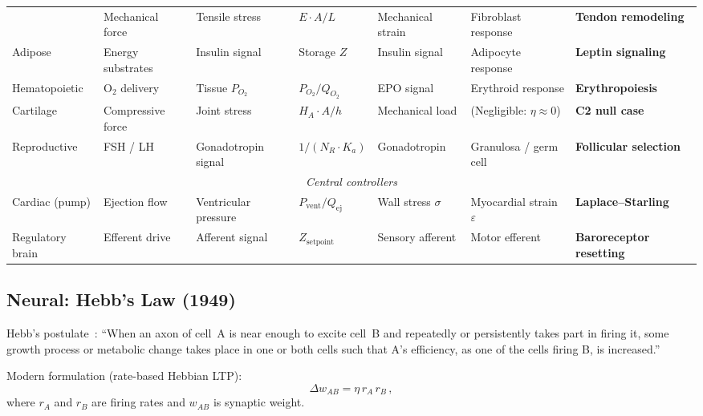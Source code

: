 \documentclass[aps,pre,twocolumn,superscriptaddress,floatfix]{revtex4-2}
\begin{document}
\begin{table}[t]
\begin{tabular}{lllllll}
  & Mechanical force & Tensile stress & $E \cdot A/L$
  & Mechanical strain & Fibroblast response & \textbf{Tendon remodeling} \\
Adipose
  & Energy substrates & Insulin signal & Storage $Z$
  & Insulin signal & Adipocyte response & \textbf{Leptin signaling} \\
Hematopoietic
  & O$_2$ delivery & Tissue $P_{O_2}$ & $P_{O_2}/Q_{O_2}$
  & EPO signal & Erythroid response & \textbf{Erythropoiesis} \\
Cartilage
  & Compressive force & Joint stress & $H_A \cdot A/h$
  & Mechanical load & (Negligible: $\eta \approx 0$) & \textbf{C2 null case} \\
Reproductive
  & FSH / LH & Gonadotropin signal & $1/(N_R \cdot K_a)$
  & Gonadotropin & Granulosa / germ cell & \textbf{Follicular selection} \\
\midrule
\multicolumn{7}{c}{\emph{Central controllers}} \\
\midrule
Cardiac (pump)
  & Ejection flow & Ventricular pressure & $P_{\text{vent}}/Q_{\text{ej}}$
  & Wall stress $\sigma$ & Myocardial strain $\varepsilon$ & \textbf{Laplace--Starling} \\
Regulatory brain
  & Efferent drive & Afferent signal & $Z_{\text{setpoint}}$
  & Sensory afferent & Motor efferent & \textbf{Baroreceptor resetting} \\
\bottomrule
\end{tabular}
\end{table}


\subsection{Neural: Hebb's Law (1949)}
\label{sec:hebb}

Hebb's postulate~\cite{Hebb1949}:
``When an axon of cell~A is near enough to excite cell~B
and repeatedly or persistently takes part in firing it,
some growth process or metabolic change takes place
in one or both cells such that A's efficiency, as one
of the cells firing B, is increased.''

Modern formulation (rate-based Hebbian LTP):
\begin{equation}
  \Delta w_{AB} = \eta\,r_A\,r_B\,,
  \label{eq:hebb-classical}
\end{equation}
where $r_A$ and $r_B$ are firing rates and $w_{AB}$ is
synaptic weight.
\end{document}
